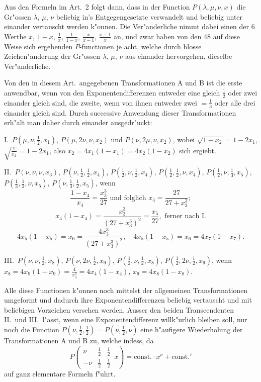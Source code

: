 \documentclass[12pt,a4paper]{book}
\theoremstyle{definition}
\theoremstyle{remark}
\begin{document}
Aus den Formeln im Art.~2 folgt dann, dass in der Function $P(\lambda, \mu, \nu, x)$ die Gr{"o}ssen $\lambda$, $\mu$, $\nu$ beliebig in's Entgegengesetzte verwandelt und beliebig unter einander vertauscht werden k{"o}nnen. Die Ver{"a}nderliche nimmt dabei einen der 6 Werthe $x$, $1 - x$, $\frac{1}{x}$, $\frac{1}{1-x}$, $\frac{x}{x-1}$, $\frac{x-1}{x}$ an, und zwar haben von den 48 auf diese Weise sich ergebenden $P$-functionen je acht, welche durch blosse Zeichen{"a}nderung der Gr{"o}ssen $\lambda$, $\mu$, $\nu$ aus einander hervorgehen, dieselbe Ver{"a}nderliche.

Von den in diesem Art.\ angegebenen Transformationen A und B ist die erste anwendbar, wenn von den Exponentendifferenzen entweder eine gleich $\frac{1}{2}$ oder zwei einander gleich sind, die zweite, wenn von ihnen entweder zwei $= \frac{1}{3}$ oder alle drei einander gleich sind. Durch successive Anwendung dieser Transformationen erh{"a}lt man daher durch einander ausgedr{"u}ckt:

I.\ $P(\mu, \nu, \frac{1}{2}, x_1)$, $P(\mu, 2\nu, \nu, x_2)$ und $P(\nu, 2\mu, \nu, x_2)$, wobei $\sqrt{1-x_2} = 1 - 2x_1$, $\sqrt{\frac{1}{x_2}} = 1 - 2x_1$, also $x_2 = 4x_1(1-x_1) = 4x_2(1-x_2)$ sich ergiebt.

II.\ $P(\nu, \nu, \nu, x_3)$, $P(\nu, \frac{1}{2}, \frac{1}{2}, x_4)$, $P(\frac{1}{2}, \nu, \frac{1}{2}, x_4)$, $P(\frac{1}{2}, \frac{1}{2}, \nu, x_4)$, $P(\frac{1}{2}, \nu, \frac{1}{3}, x_5)$, $P(\frac{1}{3}, \frac{1}{2}, \nu, x_5)$, $P(\nu, \frac{1}{3}, \frac{1}{2}, x_5)$, wenn
\[
\frac{1-x_4}{x_4} = \frac{x_3^3}{27} \text{ und folglich } x_4 = \frac{27}{27+x_3^3};
\]
\[
x_4(1-x_4) = \frac{x_3^3}{(27+x_3^3)^2} = \frac{x_5}{27}, \text{ ferner nach I.}
\]
\[
4x_5(1-x_5) = x_6 = \frac{4x_3^3}{(27+x_3^3)^2}, \quad 4x_5(1-x_5) = x_6 = 4x_7(1-x_7).
\]

III.\ $P(\nu, \nu, \frac{1}{2}, x_8)$, $P(\nu, 2\nu, \frac{1}{2}, x_9)$, $P(\frac{1}{2}, \nu, \frac{1}{2}, x_8)$, $P(\frac{1}{2}, 2\nu, \frac{1}{2}, x_9)$, wenn $x_8 = 4x_9(1-x_9) = \frac{4}{x_3^3} = 4x_4(1-x_4)$, $x_9 = 4x_8(1-x_8)$.

Alle diese Functionen k{"o}nnen noch mittelst der allgemeinen Transformationen umgeformt und dadurch ihre Exponentendifferenzen beliebig vertauscht und mit beliebigen Vorzeichen versehen werden. Ausser den beiden Transcendenten II.\ und III.\ l{"a}sst, wenn eine Exponentendifferenz willk{"u}rlich bleiben soll, nur noch die Function $P(\nu, \frac{1}{2}, \frac{1}{2}) = P(\nu, \frac{1}{2}, \nu)$ eine h{"a}ufigere Wiederholung der Transformationen A und B zu, welche indess, da
\[
P\left(\begin{array}{ccc|} \nu & \frac{1}{2} & \frac{1}{2} \\ -\nu & \frac{1}{2} & \frac{1}{2} \end{array}\, x\right) = \text{const.} \cdot x^{\nu} + \text{const.}'
\]
auf ganz elementare Formeln f{"u}hrt.
\end{document}

